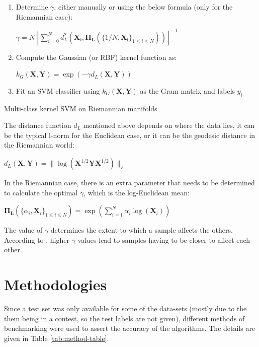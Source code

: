 \documentclass[12pt]{article}
\begin{document}
\begin{sloppypar}
\begin{algorithm}[H]
    \begin{enumerate}
        \item Determine $\gamma$, either manually or using the below formula (only for the Riemannian case):
            \begin{center}
                $\gamma = N [{\sum_{i=0}^{N} d^{2}_{L}(\bm{X_{i}, \Pi_{L}}(\{1/N, \bm{X_{i}}\}_{1 \leq i \leq N}))}]^{-1}$
            \end{center}
        \item Compute the Gaussian (or RBF) kernel function as:
            \begin{center}
                $k_{G}(\bm{X, Y}) = \exp(-\gamma d_{L}(\bm{X, Y}))$
            \end{center}
        \item Fit an SVM classifier using $k_{G}(\bm{X, Y})$ as the Gram matrix and labels $y_{i}$
    \end{enumerate}
    \caption{Multi-class kernel SVM on Riemannian manifolds}
\end{algorithm}
\vspace{5mm}
\noindent
The distance function $d_{L}$ mentioned above depends on where the data lies, it can be the typical l-norm for the Euclidean case, or it can be the geodesic distance in the Riemannian world:
\begin{center}
    $d_{L}(\bm{X, Y}) = \|\log(\bm{X}^{1/2}\bm{YX}^{1/2})\|_{F}$
\end{center}
In the Riemannian case, there is an extra parameter that needs to be determined to calculate the optimal $\gamma$, which is the log-Euclidean mean:
\begin{center}
    $\bm{\Pi_{L}}({\{\alpha_{i}, \bm{X}_{i}\}}_{1\leq i \leq N}) = \exp(\sum_{i=1}^{N} \alpha_{i}\log(\bm{X}_{i}))$
\end{center}
The value of $\gamma$ determines the extent to which a sample affects the others. According to \cite{sklearn_api}, higher $\gamma$ values lead to samples having to be closer to affect each other.

\section{Methodologies}
Since a test set was only available for some of the data-sets (mostly due to the them being in a contest, so the test labels are not given), different methods of benchmarking were used to assert the accuracy of the algorithms. The details are given in Table \ref{tab:method-table}.


\end{sloppypar}
\end{document}
